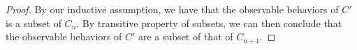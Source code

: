 \begin{proof}
        By our inductive assumption, we have that the observable behaviors of $C'$ is a subset of $C_n$. By transitive property of subsets, we can then conclude that the observable behaviors of $C'$ are a subset of that of $C_{n+1}$.

\end{proof}

